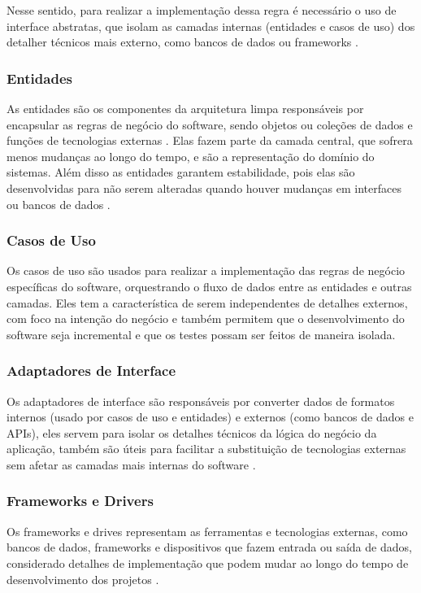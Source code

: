             \par Nesse sentido, para realizar a implementação dessa regra é necessário o uso de interface abstratas, que isolam as camadas internas (entidades e casos de uso) dos detalher técnicos mais externo, como bancos de dados ou frameworks \cite{livro:martin:cleanarch}.

        \subsubsection{Entidades}
            \par As entidades são os componentes da arquitetura limpa responsáveis por encapsular as regras de negócio do software, sendo objetos ou coleções de dados e funções de tecnologias externas \cite{livro:martin:cleanarch, artigo:ferreira:2022, artigo:dantas:2021}. Elas fazem parte da camada central, que sofrera menos mudanças ao longo do tempo, e são a representação do domínio do sistemas. Além disso  as entidades garantem estabilidade, pois elas são desenvolvidas para não serem alteradas quando houver mudanças em interfaces ou bancos de dados \cite{artigo:dantas:2021, livro:martin:cleanarch}.
            
        \subsubsection{Casos de Uso}
            \par Os casos de uso são usados para realizar a implementação das regras de negócio específicas do software, orquestrando o fluxo de dados entre as entidades e outras camadas. Eles tem a característica de serem independentes de detalhes externos, com foco na intenção do negócio e também permitem que o desenvolvimento do software seja incremental e que os testes possam ser feitos de maneira isolada. \cite{artigo:ferreira:2022, livro:martin:cleanarch}
            
        \subsubsection{Adaptadores de Interface}

            \par Os adaptadores de interface são responsáveis por converter dados de formatos internos (usado por casos de uso e entidades) e externos (como bancos de dados e APIs), eles servem para isolar os detalhes técnicos da lógica do negócio da aplicação, também são úteis para facilitar a substituição de tecnologias externas sem afetar as camadas mais internas do software \cite{livro:martin:cleanarch}. 
            
        \subsubsection{Frameworks e Drivers}

            \par Os frameworks e drives representam as ferramentas e tecnologias externas, como bancos de dados, frameworks e dispositivos que fazem entrada ou saída de dados, considerado detalhes de implementação que podem mudar ao longo do tempo de desenvolvimento dos projetos \cite{livro:martin:cleanarch}.